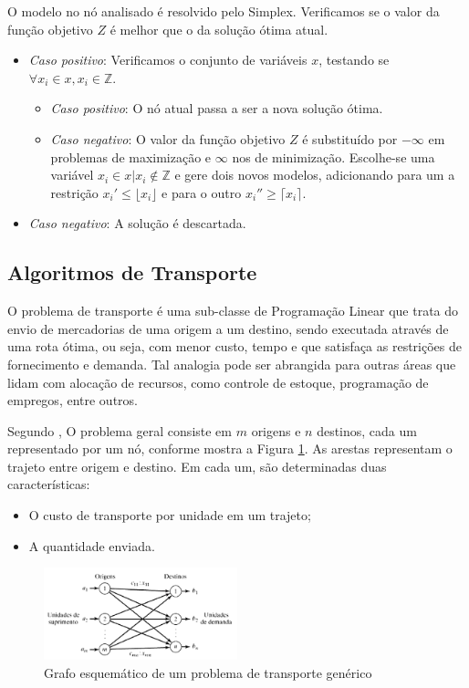 \documentclass [11pt]{articleSBPO}
\begin{document}
\noindent O modelo no nó analisado é resolvido pelo Simplex. Verificamos se o valor da função objetivo $Z$ é melhor que o da solução ótima atual.
\begin{itemize}
	\item \textit{Caso positivo}: Verificamos o conjunto de variáveis $x$, testando se $\forall  x_{i} \in x, x_{i} \in \mathbb{Z}$.
	\begin{itemize}
		\item \textit{Caso positivo}: O nó atual passa a ser a nova solução ótima.
		\item \textit{Caso negativo}: O valor da função objetivo $Z$ é substituído por $-\infty$ em problemas de maximização e $\infty$ nos de minimização. Escolhe-se uma variável $x_{i} \in x | x_{i} \notin \mathbb{Z}$ e gere dois novos modelos, adicionando para um a restrição $x_{i}' \leq \lfloor x_{i} \rfloor$ e para o outro $x_{i}'' \geq \lceil x_{i} \rceil$.
	\end{itemize}
	\item \textit{Caso negativo}: A solução é descartada. 
\end{itemize}

\subsection{Algoritmos de Transporte}\label{subsec:transporte}

O problema de transporte é uma sub-classe de Programação Linear que trata do envio de mercadorias de uma origem a um destino, sendo executada através de uma rota ótima, ou seja, com menor custo, tempo e que satisfaça as restrições de fornecimento e demanda. Tal analogia pode ser abrangida para outras áreas que lidam com alocação de recursos, como controle de estoque, programação de empregos, entre outros.

Segundo \cite{taha}, O problema geral consiste em $m$ origens e $n$ destinos, cada um representado por um nó, conforme mostra a Figura \ref{fig:grafotransporte}. As arestas representam o trajeto entre origem e destino. Em cada um, são determinadas duas características:

\begin{itemize}
	\item O custo de transporte por unidade em um trajeto;
	\item A quantidade enviada.
\end{itemize}

\begin{figure}[!h]
	\centering
	\includegraphics[width=0.5\textwidth]{img/grafotransporte.png}
	\caption[]{Grafo esquemático de um problema de transporte genérico}
	\label{fig:grafotransporte}
\end{figure}
\end{document}
